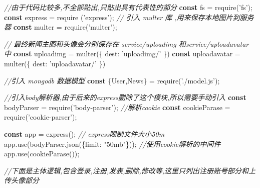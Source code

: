\documentclass[]{article}
\newenvironment{Shaded}{}{}
\newcommand{\AttributeTok}[1]{\textcolor[rgb]{0.49,0.56,0.16}{#1}}
\newcommand{\CommentTok}[1]{\textcolor[rgb]{0.38,0.63,0.69}{\textit{#1}}}
\newcommand{\DataTypeTok}[1]{\textcolor[rgb]{0.56,0.13,0.00}{#1}}
\newcommand{\KeywordTok}[1]{\textcolor[rgb]{0.00,0.44,0.13}{\textbf{#1}}}
\newcommand{\NormalTok}[1]{#1}
\newcommand{\OperatorTok}[1]{\textcolor[rgb]{0.40,0.40,0.40}{#1}}
\newcommand{\StringTok}[1]{\textcolor[rgb]{0.25,0.44,0.63}{#1}}
\newcommand{\VariableTok}[1]{\textcolor[rgb]{0.10,0.09,0.49}{#1}}
\begin{document}
\begin{Shaded}
\begin{Highlighting}[]
\CommentTok{//由于代码比较多,不全部贴出,只贴出具有代表性的部分}
\KeywordTok{const}\NormalTok{ fs }\OperatorTok{=} \AttributeTok{require}\NormalTok{(}\StringTok{'fs'}\NormalTok{)}\OperatorTok{;}
\KeywordTok{const}\NormalTok{ express }\OperatorTok{=} \AttributeTok{require}\NormalTok{ (}\StringTok{'express'}\NormalTok{)}\OperatorTok{;}
\CommentTok{// 引入 multer 库 ,用来保存本地图片到服务器}
\KeywordTok{const}\NormalTok{ multer  }\OperatorTok{=} \AttributeTok{require}\NormalTok{(}\StringTok{'multer'}\NormalTok{)}\OperatorTok{;}

\CommentTok{// 最终新闻主图和头像会分别保存在 service/uploadimg 和service/uploadavatar 中}
\KeywordTok{const}\NormalTok{ uploadimg }\OperatorTok{=} \AttributeTok{multer}\NormalTok{(}\OperatorTok{\{} \DataTypeTok{dest}\OperatorTok{:} \StringTok{'uploadimg/'} \OperatorTok{\}}\NormalTok{)}
\KeywordTok{const}\NormalTok{ uploadavatar }\OperatorTok{=} \AttributeTok{multer}\NormalTok{(}\OperatorTok{\{} \DataTypeTok{dest}\OperatorTok{:} \StringTok{'uploadavatar/'} \OperatorTok{\}}\NormalTok{)}

\CommentTok{//引入 mongodb 数据模型}
\KeywordTok{const} \OperatorTok{\{}\NormalTok{User}\OperatorTok{,}\NormalTok{News}\OperatorTok{\}} \OperatorTok{=} \AttributeTok{require}\NormalTok{(}\StringTok{'./model.js'}\NormalTok{)}\OperatorTok{;}

\CommentTok{//引入body解析器,由于后来的express删除了这个模块,所以需要手动引入}
\KeywordTok{const}\NormalTok{ bodyParser }\OperatorTok{=} \AttributeTok{require}\NormalTok{(}\StringTok{'body-parser'}\NormalTok{)}\OperatorTok{;}
\CommentTok{//解析cookie}
\KeywordTok{const}\NormalTok{ cookieParase }\OperatorTok{=} \AttributeTok{require}\NormalTok{(}\StringTok{'cookie-parser'}\NormalTok{)}\OperatorTok{;}

\KeywordTok{const}\NormalTok{ app }\OperatorTok{=} \AttributeTok{express}\NormalTok{()}\OperatorTok{;}
\CommentTok{// express限制文件大小50m}
\VariableTok{app}\NormalTok{.}\AttributeTok{use}\NormalTok{(}\VariableTok{bodyParser}\NormalTok{.}\AttributeTok{json}\NormalTok{(}\OperatorTok{\{}\DataTypeTok{limit}\OperatorTok{:} \StringTok{"50mb"}\OperatorTok{\}}\NormalTok{))}\OperatorTok{;}
\CommentTok{//使用cookie解析的中间件}
\VariableTok{app}\NormalTok{.}\AttributeTok{use}\NormalTok{(}\AttributeTok{cookieParase}\NormalTok{())}\OperatorTok{;}

\CommentTok{//下面是主体逻辑,包含登录,注册,发表,删除,修改等,这里只列出注册账号部分和上传头像部分}


\end{Highlighting}
\end{Shaded}
\end{document}
